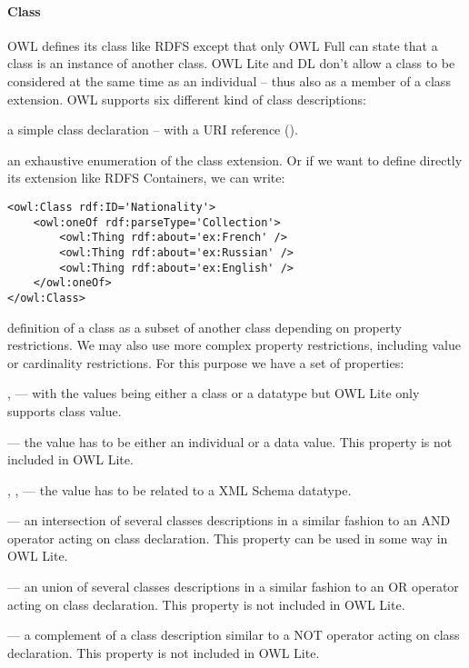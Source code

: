 \paragraph{Class}
OWL defines its class like RDFS except that only OWL Full can state that a class is an instance of another class. 
OWL Lite and DL don't allow a class to be considered at the same time as an individual – thus also as a member of a class extension. 
OWL supports six different kind of class descriptions: 
\begin{liste}
	\item a simple class declaration – with a URI reference ().

	\item an exhaustive enumeration of the class extension. Or if we want to define directly its extension like RDFS Containers, we can write:
	\begin{Verbatim}[fontsize=\small,formatcom=\color{black!70}]
<owl:Class rdf:ID='Nationality'>
	<owl:oneOf rdf:parseType='Collection'>
		<owl:Thing rdf:about='ex:French' />
		<owl:Thing rdf:about='ex:Russian' />
		<owl:Thing rdf:about='ex:English' />
	</owl:oneOf>
</owl:Class>
	\end{Verbatim}

	\item definition of a class as a subset of another class depending on property restrictions. 
	We may also use more complex property restrictions, including value or  cardinality restrictions. 
	For this purpose we have a set of properties:
	\begin{liste}
		\item {},  --- with the values being either a class or a datatype but OWL Lite only supports class value.
		\item {} --- the value has to be either an individual or a data value. This property is not included in OWL Lite. 
		\item {}, ,  --- the value has to be related to a XML Schema datatype.
	\end{liste}

	\item {} --- an intersection of several classes descriptions in a similar fashion to an AND operator acting on  class declaration. 
	This property can be used in some way in OWL Lite.
	\item {} --- an union of several classes descriptions in a similar fashion to an OR operator acting on class declaration. 
	This property is not included in OWL Lite. 
	\item {} --- a complement of a class description similar to a NOT operator acting on class declaration. 
	This property is not included in OWL Lite.
\end{liste}


